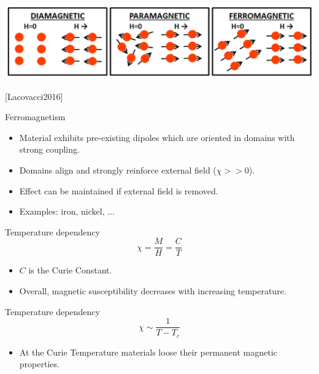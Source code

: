 \begin{frame}
  \begin{center}
    \includegraphics[width=0.7\linewidth]{Figures/Magnetics/ParaDiaFerro_Lacovacci2016.png}
  
    \tiny[Lacovacci2016]

    \vspace{0.24cm}
    
    \normalsize Ferromagnetism
    \small 
    \begin{itemize}
      \item Material exhibits \alert{pre-existing} dipoles which are oriented in domains with strong coupling.
      \item Domains align and \alert{strongly reinforce} external field ($\chi >> 0$). 
      \item Effect can be maintained if external field is removed.
      \item Examples: iron, nickel, ...
    \end{itemize}
    
  \end{center}
\end{frame}


\begin{frame}
  \begin{PointSix}{Temperature dependency}
    $$
      \chi = \frac{M}{H} = \frac{C}{T}
    $$
    \small
    \begin{itemize}
      \item $C$ is the Curie Constant.
      \item Overall, magnetic susceptibility decreases with increasing temperature.
    \end{itemize}
  \end{PointSix}
\end{frame}

\begin{frame}
  \begin{PointSix}{Temperature dependency}
    $$
      \chi \sim  \frac{1}{T - T_c}
    $$
    \small
    \begin{itemize}
      \item At the Curie Temperature materials loose their permanent magnetic properties.
    \end{itemize}
  \end{PointSix}
\end{frame}


